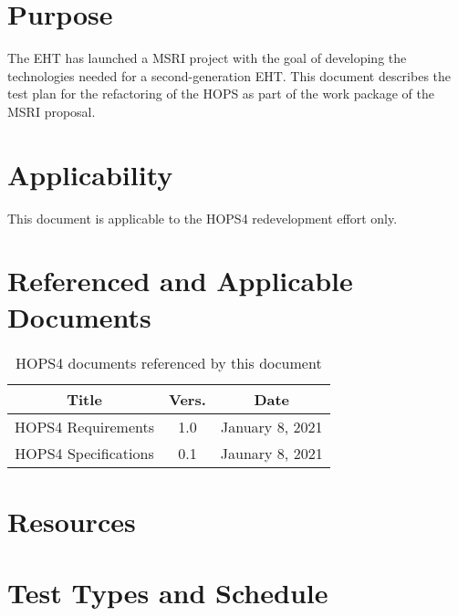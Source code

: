 \documentclass[notitlepage,letterpaper,pdftex,12pt,final]{article}
\numberwithin{equation}{section}
\begin{document}
\section{Purpose}
\label{sec:purpose}
The \ac{EHT} has launched a \ac{MSRI} project with the goal of developing
the technologies needed for a second-generation \acs{EHT}. 
This document describes the test plan for the refactoring of the \ac{HOPS}
as part of the work package of the \acs{MSRI} proposal. 

\section{Applicability}
\label{sec:applicability}
This document is applicable to the HOPS4 redevelopment effort only.

\section{Referenced and Applicable Documents}
\label{sec:referenced-docs}
\begin{table}[h!]
\centering
 \begin{tabular}{c | c | c } 
 Title & Vers. & Date \\ [0.5ex]
 \hline%
 HOPS4 Requirements & 1.0 & January 8, 2021 \\ [1ex]
 HOPS4 Specifications & 0.1 & Jaunary 8, 2021 \\
 \end{tabular}
 \caption{HOPS4 documents referenced by this document}
 \label{table:1}
\end{table}

\section{Resources}
\label{sec:resources}


\section{Test Types and Schedule}
\label{sec:schedule}
\end{document}
